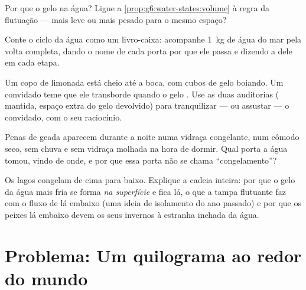 \begin{exercise}[$\star$]\label{exo:g6:water-states:8}
Por que o gelo  na água? Ligue a
\cref{prop:g6:water-states:volume} à regra da flutuação --- mais leve
ou mais pesado para o mesmo espaço?
\end{exercise}

\begin{exercise}[$\star\star$]\label{exo:g6:water-states:9}
Conte o ciclo da água como um livro-caixa: acompanhe \qty{1}{kg} de
água do mar pela volta completa, dando o nome de cada porta por que
ele passa e dizendo a  dele em cada etapa.
\end{exercise}

\begin{exercise}[$\star\star$]\label{exo:g6:water-states:10}
Um copo de limonada está cheio até a boca, com cubos de gelo boiando.
Um convidado teme que ele transborde quando o gelo . Use as
duas auditorias ( mantida, espaço extra do gelo devolvido) para
tranquilizar --- ou assustar --- o convidado, com o seu raciocínio.
\end{exercise}

\begin{exercise}[$\star\star$]\label{exo:g6:water-states:11}
Penas de geada aparecem durante a noite numa vidraça congelante, num
cômodo seco, sem chuva e sem vidraça molhada na hora de dormir. Qual
porta a água tomou, vindo de onde, e por que essa porta não se chama
``congelamento''?
\end{exercise}

\begin{exercise}[$\star\star\star$]\label{exo:g6:water-states:12}
Os lagos congelam de cima para baixo. Explique a cadeia inteira: por
que o gelo da água mais fria se forma \emph{na superfície} e fica lá,
o que a tampa flutuante faz com o fluxo de  lá embaixo (uma
ideia de isolamento do ano passado) e por que os peixes lá embaixo
devem os seus invernos à estranha inchada da água.
\end{exercise}

\section{Problema: Um quilograma ao redor do mundo}

